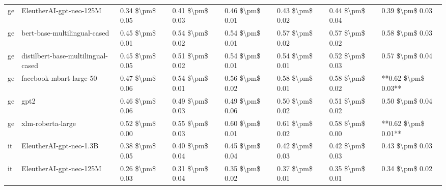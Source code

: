 \begin{tabular}{llllllll}
      ge &            EleutherAI-gpt-neo-125M & 0.34 \$\textbackslash pm\$ 0.05 &           0.41 \$\textbackslash pm\$ 0.03 &       0.46 \$\textbackslash pm\$ 0.01 &        0.43 \$\textbackslash pm\$ 0.02 &                         0.44 \$\textbackslash pm\$ 0.04 &     0.39 \$\textbackslash pm\$ 0.03 \\
      ge &       bert-base-multilingual-cased & 0.45 \$\textbackslash pm\$ 0.01 &           0.54 \$\textbackslash pm\$ 0.02 &       0.54 \$\textbackslash pm\$ 0.01 &        0.57 \$\textbackslash pm\$ 0.02 &                         0.57 \$\textbackslash pm\$ 0.02 &     0.58 \$\textbackslash pm\$ 0.03 \\
      ge & distilbert-base-multilingual-cased & 0.45 \$\textbackslash pm\$ 0.05 &           0.51 \$\textbackslash pm\$ 0.02 &       0.54 \$\textbackslash pm\$ 0.01 &        0.54 \$\textbackslash pm\$ 0.01 &                         0.52 \$\textbackslash pm\$ 0.03 &     0.57 \$\textbackslash pm\$ 0.04 \\
      ge &            facebook-mbart-large-50 & 0.47 \$\textbackslash pm\$ 0.06 &           0.54 \$\textbackslash pm\$ 0.01 &       0.56 \$\textbackslash pm\$ 0.02 &        0.58 \$\textbackslash pm\$ 0.01 &                         0.58 \$\textbackslash pm\$ 0.02 & **0.62 \$\textbackslash pm\$ 0.03** \\
      ge &                               gpt2 & 0.46 \$\textbackslash pm\$ 0.06 &           0.49 \$\textbackslash pm\$ 0.03 &       0.49 \$\textbackslash pm\$ 0.06 &        0.50 \$\textbackslash pm\$ 0.02 &                         0.51 \$\textbackslash pm\$ 0.02 &     0.50 \$\textbackslash pm\$ 0.04 \\
      ge &                  xlm-roberta-large & 0.52 \$\textbackslash pm\$ 0.00 &           0.55 \$\textbackslash pm\$ 0.03 &       0.60 \$\textbackslash pm\$ 0.01 &        0.61 \$\textbackslash pm\$ 0.02 &                         0.58 \$\textbackslash pm\$ 0.00 & **0.62 \$\textbackslash pm\$ 0.01** \\
      it &            EleutherAI-gpt-neo-1.3B & 0.38 \$\textbackslash pm\$ 0.05 &           0.40 \$\textbackslash pm\$ 0.04 &       0.45 \$\textbackslash pm\$ 0.04 &        0.42 \$\textbackslash pm\$ 0.03 &                         0.42 \$\textbackslash pm\$ 0.03 &     0.43 \$\textbackslash pm\$ 0.03 \\
      it &            EleutherAI-gpt-neo-125M & 0.26 \$\textbackslash pm\$ 0.03 &           0.31 \$\textbackslash pm\$ 0.04 &       0.35 \$\textbackslash pm\$ 0.02 &        0.37 \$\textbackslash pm\$ 0.01 &                         0.35 \$\textbackslash pm\$ 0.01 &     0.34 \$\textbackslash pm\$ 0.02 \\

\end{tabular}
